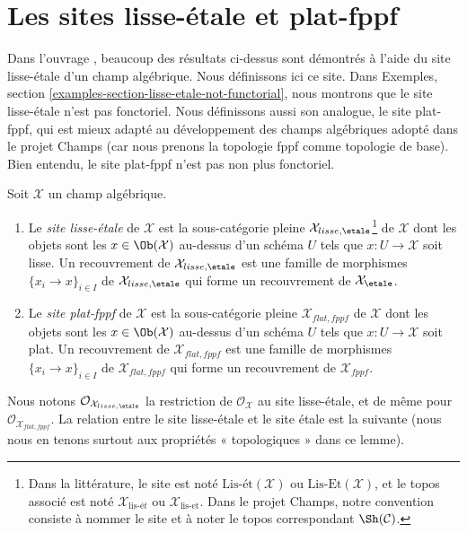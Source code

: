 \section{Les sites lisse-étale et plat-fppf}
\label{section-lisse-etale}

\noindent
Dans l'ouvrage \cite{LM-B}, beaucoup des résultats ci-dessus sont démontrés à l'aide du
site lisse-étale d'un champ algébrique. Nous définissons ici ce site.
Dans Exemples, section \ref{examples-section-lisse-etale-not-functorial},
nous montrons que le site lisse-étale n'est pas fonctoriel.
Nous définissons aussi son analogue, le site plat-fppf, qui est mieux adapté
au développement des champs algébriques adopté dans le projet Champs
(car nous prenons la topologie fppf comme topologie de base). Bien entendu, le
site plat-fppf n'est pas non plus fonctoriel.

\begin{definition}
\label{definition-lisse-etale}
Soit $\mathcal{X}$ un champ algébrique.
\begin{enumerate}
\item Le {\it site lisse-étale} de $\mathcal{X}$ est la sous-catégorie pleine
$\mathcal{X}_{lisse,\etale}$\footnote{Dans la littérature, le
site est noté $\text{Lis-\'et}(\mathcal{X})$ ou
$\text{Lis-Et}(\mathcal{X})$, et le topos associé est noté
$\mathcal{X}_{\text{lis-\'e}t}$ ou $\mathcal{X}_{\text{lis-et}}$.
Dans le projet Champs, notre convention consiste à nommer le site et à
noter le topos correspondant $\Sh(\mathcal{C})$.} de $\mathcal{X}$
dont les objets sont les $x \in \Ob(\mathcal{X})$ au-dessus d'un schéma $U$
tels que $x : U \to \mathcal{X}$ soit lisse. Un recouvrement de
$\mathcal{X}_{lisse,\etale}$ est une famille de morphismes
$\{x_i \to x\}_{i \in I}$ de $\mathcal{X}_{lisse,\etale}$
qui forme un recouvrement de $\mathcal{X}_\etale$.
\item Le {\it site plat-fppf} de $\mathcal{X}$ est la sous-catégorie pleine
$\mathcal{X}_{flat,fppf}$ de $\mathcal{X}$
dont les objets sont les $x \in \Ob(\mathcal{X})$ au-dessus d'un schéma $U$
tels que $x : U \to \mathcal{X}$ soit plat. Un recouvrement de
$\mathcal{X}_{flat,fppf}$ est une famille de morphismes
$\{x_i \to x\}_{i \in I}$ de $\mathcal{X}_{flat,fppf}$
qui forme un recouvrement de $\mathcal{X}_{fppf}$.
\end{enumerate}
\end{definition}

\noindent
Nous notons $\mathcal{O}_{\mathcal{X}_{lisse,\etale}}$
la restriction de $\mathcal{O}_\mathcal{X}$ au site lisse-étale,
et de même pour $\mathcal{O}_{\mathcal{X}_{flat,fppf}}$.
La relation entre le site lisse-étale et le site étale est
la suivante (nous nous en tenons surtout aux propriétés « topologiques » dans ce lemme).

